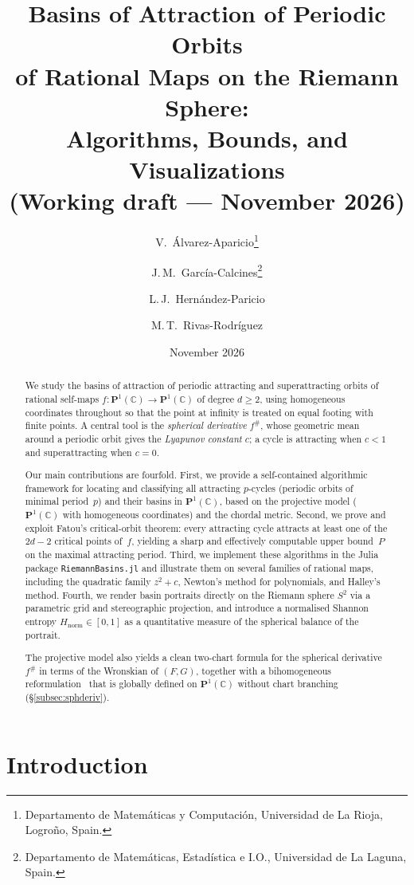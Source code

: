 \documentclass[12pt]{article}
\title{\textbf{Basins of Attraction of Periodic Orbits\\
        of Rational Maps on the Riemann Sphere:\\
        Algorithms, Bounds, and Visualizations}\\[6pt]
       {\large (Working draft --- November 2026)}}
\author{V.~\'Alvarez-Aparicio\thanks{Departamento de Matem\'aticas y
Computaci\'on, Universidad de La Rioja, Logro\~no, Spain.} \and
J.\,M.~Garc\'ia-Calcines\thanks{Departamento de Matem\'aticas,
Estad\'istica e I.O., Universidad de La Laguna, Spain.} \and
L.\,J.~Hern\'andez-Paricio\footnotemark[1] \and
M.\,T.~Rivas-Rodr\'iguez\footnotemark[1]}
\date{November 2026}
\theoremstyle{definition}
\newcommand{\C}{\mathbb{C}}
\newcommand{\Pone}{\mathbf{P}^1(\C)}
\newcommand{\fsh}{f^{\#}}
\begin{document}
\maketitle

\begin{abstract}
We study the basins of attraction of periodic attracting and superattracting
orbits of rational self-maps $f\colon\Pone\to\Pone$ of degree $d\geq 2$,
using homogeneous coordinates throughout so that the point at infinity is
treated on equal footing with finite points.  A central tool is the
\emph{spherical derivative} $\fsh$, whose geometric mean around a periodic
orbit gives the \emph{Lyapunov constant} $c$; a cycle is attracting when
$c<1$ and superattracting when $c=0$.

Our main contributions are fourfold.  First, we provide a self-contained
algorithmic framework for locating and classifying all attracting $p$-cycles
(periodic orbits of minimal period~$p$) and their basins in $\Pone$, based
on the projective model ($\Pone$ with homogeneous coordinates) and the chordal metric.  Second, we prove and exploit
Fatou's critical-orbit theorem: every attracting cycle attracts at least one
of the $2d-2$ critical points of~$f$, yielding a sharp and effectively
computable upper bound~$P$ on the maximal attracting period.  Third, we
implement these algorithms in the Julia package \texttt{RiemannBasins.jl}
and illustrate them on several families of rational maps, including the
quadratic family $z^2+c$, Newton's method for polynomials, and Halley's
method.  Fourth, we render basin portraits directly on the Riemann sphere
$S^2$ via a parametric grid and stereographic projection, and introduce a
normalised Shannon entropy $H_{\mathrm{norm}}\in[0,1]$ as a quantitative
measure of the spherical balance of the portrait.

The projective model also yields a clean two-chart formula for the spherical
derivative $\fsh$ in terms of the Wronskian of $(F,G)$, together with a
bihomogeneous reformulation~\cite{AlvarezAparicio2023} that is globally defined
on $\Pone$ without chart branching (\S\ref{subsec:sphderiv}).
\end{abstract}

\tableofcontents

\section{Introduction}
\label{sec:intro}
\end{document}
